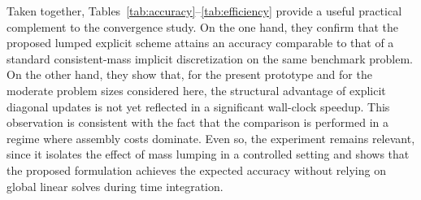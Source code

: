 \documentclass{article}
\begin{document}
Taken together, Tables~\ref{tab:accuracy}--\ref{tab:efficiency} provide a useful practical complement to the convergence study. On the one hand, they confirm that the proposed lumped explicit scheme attains an accuracy comparable to that of a standard consistent-mass implicit discretization on the same benchmark problem. On the other hand, they show that, for the present prototype and for the moderate problem sizes considered here, the structural advantage of explicit diagonal updates is not yet reflected in a significant wall-clock speedup. This observation is consistent with the fact that the comparison is performed in a regime where assembly costs dominate. Even so, the experiment remains relevant, since it isolates the effect of mass lumping in a controlled setting and shows that the proposed formulation achieves the expected accuracy without relying on global linear solves during time integration.
\end{document}
